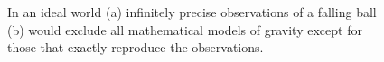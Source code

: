 \documentclass[
  letterpaper,
  DIV=11,
  numbers=noendperiod]{scrartcl}
\begin{document}
\begin{figure}

\begin{minipage}[t]{0.50\linewidth}

{\centering 


}

\subcaption{\label{fig-exact-data}}
\end{minipage}%
%
\begin{minipage}[t]{0.50\linewidth}

{\centering 


}

\subcaption{\label{fig-exact-fit}}
\end{minipage}%

\caption{\label{fig-ideal}In an ideal world (a) infinitely precise
observations of a falling ball (b) would exclude all mathematical models
of gravity except for those that exactly reproduce the observations.}

\end{figure}
\end{document}
